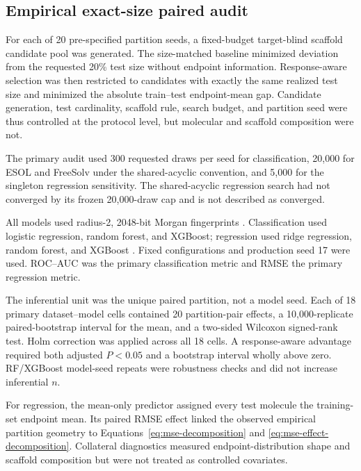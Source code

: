 \subsection{Empirical exact-size paired audit}

For each of 20 pre-specified partition seeds, a fixed-budget target-blind scaffold candidate pool was generated. The size-matched baseline minimized deviation from the requested 20\% test size without endpoint information. Response-aware selection was then restricted to candidates with exactly the same realized test size and minimized the absolute train--test endpoint-mean gap. Candidate generation, test cardinality, scaffold rule, search budget, and partition seed were thus controlled at the protocol level, but molecular and scaffold composition were not.

The primary audit used 300 requested draws per seed for classification, 20,000 for ESOL and FreeSolv under the shared-acyclic convention, and 5,000 for the singleton regression sensitivity. The shared-acyclic regression search had not converged by its frozen 20,000-draw cap and is not described as converged.

All models used radius-2, 2048-bit Morgan fingerprints \citep{rogers2010extended}. Classification used logistic regression, random forest, and XGBoost; regression used ridge regression, random forest, and XGBoost \citep{pedregosa2011scikit,breiman2001random,chen2016xgboost}. Fixed configurations and production seed 17 were used. ROC--AUC was the primary classification metric and RMSE the primary regression metric.

The inferential unit was the unique paired partition, not a model seed. Each of 18 primary dataset--model cells contained 20 partition-pair effects, a 10,000-replicate paired-bootstrap interval for the mean, and a two-sided Wilcoxon signed-rank test. Holm correction was applied across all 18 cells. A response-aware advantage required both adjusted $P<0.05$ and a bootstrap interval wholly above zero. RF/XGBoost model-seed repeats were robustness checks and did not increase inferential $n$.

For regression, the mean-only predictor assigned every test molecule the training-set endpoint mean. Its paired RMSE effect linked the observed empirical partition geometry to Equations~\ref{eq:mse-decomposition} and \ref{eq:mse-effect-decomposition}. Collateral diagnostics measured endpoint-distribution shape and scaffold composition but were not treated as controlled covariates.

